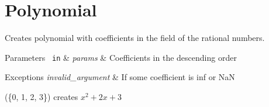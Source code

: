 \hypertarget{_polynomial-example}{}\section{Polynomial}
Creates polynomial with coefficients in the field of the rational numbers.


\begin{DoxyParams}[1]{Parameters}
\mbox{\texttt{ in}}  & {\em params} & Coefficients in the descending order \\
\hline
\end{DoxyParams}

\begin{DoxyExceptions}{Exceptions}
{\em invalid\+\_\+argument} & If some coefficient is inf or NaN\\
\hline
\end{DoxyExceptions}
(\{0, 1, 2, 3\}) creates $ x^2 + 2x + 3 $


\begin{DoxyCodeInclude}{0}
\end{DoxyCodeInclude}
 